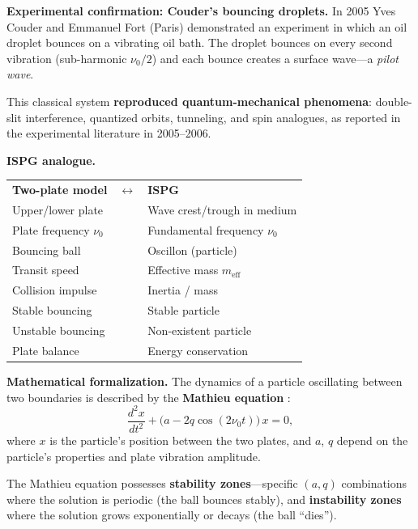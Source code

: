 \documentclass[11pt]{article}
\begin{document}
\medskip
\textbf{Experimental confirmation: Couder's bouncing droplets.}
In 2005 Yves Couder and Emmanuel Fort (Paris) demonstrated an
experiment in which an oil droplet bounces on a vibrating oil bath.
The droplet bounces on every second vibration (sub-harmonic
$\nu_0/2$) and each bounce creates a surface wave---a
\emph{pilot wave}.

This classical system \textbf{reproduced quantum-mechanical
phenomena}: double-slit interference, quantized orbits, tunneling,
and spin analogues, as reported in the experimental literature
in 2005--2006.

\medskip
\textbf{ISPG analogue.}
\begin{center}
\renewcommand{\arraystretch}{1.3}
\begin{tabular}{@{}lll@{}}
\textbf{Two-plate model} & $\longleftrightarrow$
  & \textbf{ISPG} \\
Upper/lower plate & & Wave crest/trough in medium \\
Plate frequency $\nu_0$ & & Fundamental frequency $\nu_0$ \\
Bouncing ball & & Oscillon (particle) \\
Transit speed & & Effective mass $m_{\mathrm{eff}}$ \\
Collision impulse & & Inertia / mass \\
Stable bouncing & & Stable particle \\
Unstable bouncing & & Non-existent particle \\
Plate balance & & Energy conservation \\
\end{tabular}
\end{center}

\medskip
\textbf{Mathematical formalization.}
The dynamics of a particle oscillating between two boundaries is
described by the \textbf{Mathieu equation} \cite{McLachlan1947,DLMFMathieu}:
\begin{equation}
  \frac{d^2 x}{dt^2}
  + \bigl(a - 2q\cos(2\nu_0 t)\bigr)\,x = 0,
  \label{eq:mathieu}
\end{equation}
where $x$ is the particle's position between the two plates, and
$a$, $q$ depend on the particle's properties and plate vibration
amplitude.

The Mathieu equation possesses \textbf{stability zones}---specific
$(a, q)$ combinations where the solution is periodic (the ball
bounces stably), and \textbf{instability zones} where the solution
grows exponentially or decays (the ball ``dies'').
\end{document}
